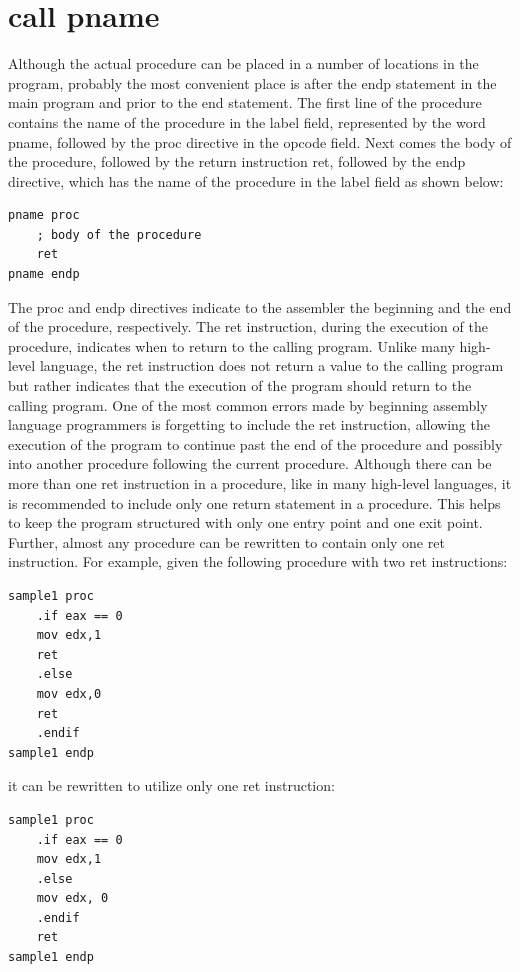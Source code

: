 \documentclass[10pt]{article}
\begin{document}
\section*{call pname}
Although the actual procedure can be placed in a number of locations in the program, probably the most convenient place is after the endp statement in the main program and prior to the end statement. The first line of the procedure contains the name of the procedure in the label field, represented by the word pname, followed by the proc directive in the opcode field. Next comes the body of the procedure, followed by the return instruction ret, followed by the endp directive, which has the name of the procedure in the label field as shown below:

\begin{verbatim}
pname proc
    ; body of the procedure
    ret
pname endp
\end{verbatim}

The proc and endp directives indicate to the assembler the beginning and the end of the procedure, respectively. The ret instruction, during the execution of the procedure, indicates when to return to the calling program. Unlike many high-level language, the ret instruction does not return a value to the calling program but rather indicates that the execution of the program should return to the calling program. One of the most common errors made by beginning assembly language programmers is forgetting to include the ret instruction, allowing the execution of the program to continue past the end of the procedure and possibly into another procedure following the current procedure. Although there can be more than one ret instruction in a procedure, like in many high-level languages, it is recommended to include only one return statement in a procedure. This helps to keep the program structured with only one entry point and one exit point. Further, almost any procedure can be rewritten to contain only one ret instruction. For example, given the following procedure with two ret instructions:

\begin{verbatim}
sample1 proc
    .if eax == 0
    mov edx,1
    ret
    .else
    mov edx,0
    ret
    .endif
sample1 endp
\end{verbatim}

it can be rewritten to utilize only one ret instruction:

\begin{verbatim}
sample1 proc
    .if eax == 0
    mov edx,1
    .else
    mov edx, 0
    .endif
    ret
sample1 endp
\end{verbatim}
\end{document}
